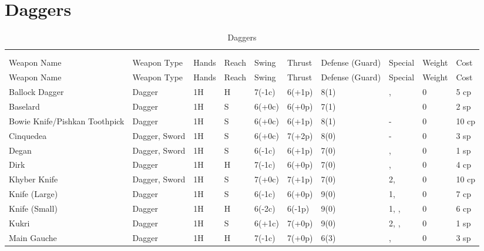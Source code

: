 \documentclass[oneside,11pt,english]{book}
\begin{document}
\section{Daggers}\vspace{-15pt}
\begin{longtabu} to 1\linewidth {X[2,l]XX[-1,c]X[-1,c]XXX[-1,c]X[2,l]X[-3,c]X[-3,r]}
  \captionsetup{labelformat=blank,textformat=empty}
  \caption{Daggers}\vspace{-15pt}\\
  \label{tab:Daggers List}\\
  Weapon Name						&Weapon Type	&Hands&Reach&Swing&Thrust&Defense (Guard)&Special						&Weight	&Cost\\\toprule\endfirsthead
  Weapon Name						&Weapon Type	&Hands&Reach&Swing&Thrust&Defense (Guard)&Special						&Weight	&Cost\\\toprule\endhead
  Ballock Dagger					&Dagger			&1H	&H	&7(-1c)	&6(+1p)	&8(1)	&, 				&0	&5 cp\\
  Baselard						&Dagger			&1H	&S	&6(+0c)	&6(+0p)	&7(1)	&							&0	&2 sp\\
  Bowie Knife/Pishkan Toothpick	&Dagger			&1H	&S	&6(+0c)	&6(+1p)	&8(1)	&-										&0	&10 cp\\
  Cinquedea						&Dagger, Sword	&1H	&S	&6(+0c)	&7(+2p)	&8(0)	&-										&0	&3 sp\\
  Degan							&Dagger, Sword	&1H	&S	&6(-1c)	&6(+1p)	&7(0)	&, 				&0	&1 sp\\
  Dirk							&Dagger			&1H	&H	&7(-1c)	&6(+0p)	&7(0)	&, 				&0	&4 cp\\
  Khyber Knife					&Dagger, Sword	&1H	&S	&7(+0c)	&7(+1p)	&7(0)	& 2, 						&0	&10 cp\\
  Knife (Large)					&Dagger			&1H	&S	&6(-1c)	&6(+0p)	&9(0)	& 1, 					&0	&7 cp\\
  Knife (Small)					&Dagger			&1H	&H	&6(-2c)	&6(-1p)	&9(0)	& 1, , 		&0	&6 cp\\
  Kukri							&Dagger			&1H	&S	&6(+1c)	&7(+0p)	&9(0)	& 2, , 		&0	&1 sp\\
  Main Gauche						&Dagger			&1H	&H	&7(-1c)	&7(+0p)	&6(3)	&, 			&0	&3 sp\\

\end{longtabu}
\end{document}

